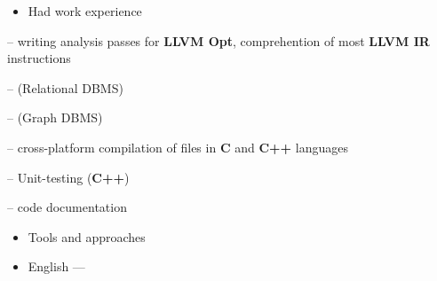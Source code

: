 \documentclass[10pt,a4paper,ragged2e,withhyper]{custom-altacv}
\begin{document}
\begin{paracol}{2}
\divider

\begin{itemize}
	\item \textcolor{emphasis}{Had work experience} 
\end{itemize}

 -- writing analysis passes for \textbf{LLVM Opt}, comprehention of most \textbf{LLVM IR} instructions
\vspace{1ex}

 --  (Relational DBMS)
\vspace{-.2ex}

 --  (Graph DBMS)
\vspace{1ex}

 -- cross-platform compilation of files in \textbf{C} and \textbf{C++} languages
\vspace{1ex}

 -- Unit-testing (\textbf{C++})
\vspace{1ex}

 -- code documentation
\vspace{1ex}

\vspace{1ex}

\divider

\begin{itemize}
	\item\textcolor{emphasis}{Tools and approaches}
\end{itemize}





\begin{itemize}
	\item English --- 
\end{itemize}

\end{paracol}
\end{document}

